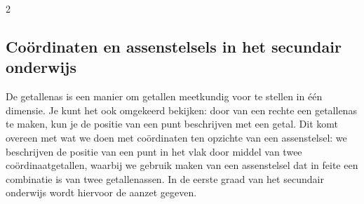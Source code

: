 \begin{multicols}{2}

\subsection{Coördinaten en assenstelsels in het secundair onderwijs}\label{couxf6rdinaten-en-assenstelsels-in-het-secundair-onderwijs}

De getallenas is een manier om getallen meetkundig voor te stellen in één dimensie.
Je kunt het ook omgekeerd bekijken: door van een rechte een getallenas te maken, kun je de positie van een punt beschrijven met een getal.
Dit komt overeen met wat we doen met coördinaten ten opzichte van een assenstelsel: we beschrijven de positie van een punt in het vlak door middel van twee coördinaatgetallen, waarbij we gebruik maken van een assenstelsel dat in feite een combinatie is van twee getallenassen.
In de eerste graad van het secundair onderwijs wordt hiervoor de aanzet gegeven.

\end{multicols}

